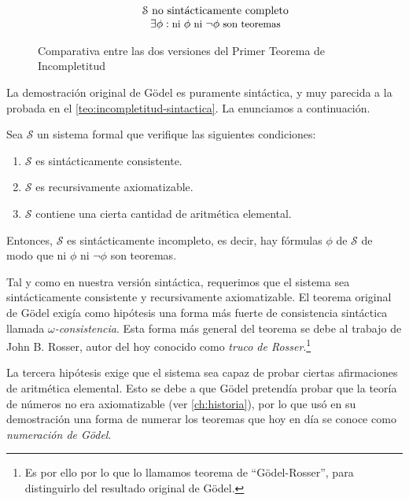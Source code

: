 \begin{figure}[H]
$$\begin{array}{ccc}
{    }
    & &
    {
        \begin{matrix}
            \tiny{\;}\\
            \mathcal{S}\text{ no sintácticamente completo}\\
            \small{\exists\phi:\text{ni }\phi\text{ ni }\neg\phi\text{ son teoremas}}
        \end{matrix}
    }
    \\
\end{array}
$$
\caption{Comparativa entre las dos versiones del Primer Teorema de Incompletitud}
\vspace{-8pt}
\label{fig:comparativa-incompletitud}
\end{figure}

La demostración original de Gödel es puramente sintáctica, y muy parecida a la probada en el \cref{teo:incompletitud-sintactica}. La enunciamos a continuación.

\begin{teorema}\label{teo:incompletitud-godel}
Sea $\mathcal{S}$ un sistema formal que verifique las siguientes condiciones:
\begin{enumerate}
    \item $\mathcal{S}$ es sintácticamente consistente.
    \item $\mathcal{S}$ es recursivamente axiomatizable.
    \item $\mathcal{S}$ contiene una cierta cantidad de aritmética elemental.
\end{enumerate}

Entonces, $\mathcal{S}$ es sintácticamente incompleto, es decir, hay fórmulas $\phi$ de $\mathcal{S}$ de modo que ni $\phi$ ni $\neg\phi$ son teoremas.
\end{teorema}

Tal y como en nuestra versión sintáctica, requerimos que el sistema sea sintácticamente consistente y recursivamente axiomatizable. El teorema original de Gödel exigía como hipótesis una forma más fuerte de consistencia sintáctica llamada \emph{$\omega$-consistencia}. Esta forma más general del teorema se debe al trabajo de John B. Rosser, autor del hoy conocido como \emph{truco de Rosser}.\footnote{Es por ello por lo que lo llamamos teorema de ``Gödel-Rosser'', para distinguirlo del resultado original de Gödel.} \cite{Rosser1936}

La tercera hipótesis exige que el sistema sea capaz de probar ciertas afirmaciones de aritmética elemental. Esto se debe a que Gödel pretendía probar que la teoría de números no era axiomatizable (ver \cref{ch:historia}), por lo que usó en su demostración una forma de numerar los teoremas que hoy en día se conoce como \emph{numeración de Gödel}.


